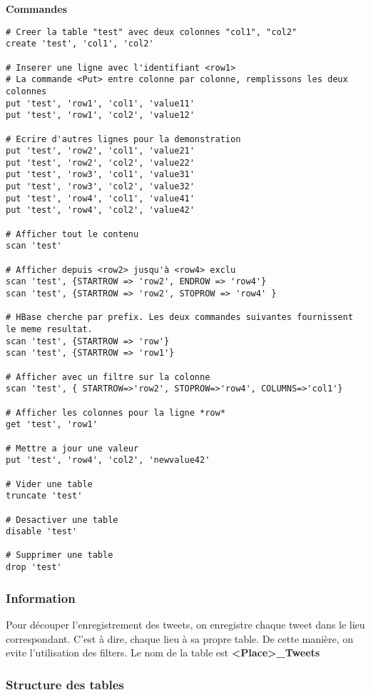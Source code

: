 \documentclass[a4paper,oneside,11pt]{article}
\begin{document}
\textbf{Commandes}

\begin{verbatim}
# Creer la table "test" avec deux colonnes "col1", "col2" 
create 'test', 'col1', 'col2'

# Inserer une ligne avec l'identifiant <row1>
# La commande <Put> entre colonne par colonne, remplissons les deux colonnes
put 'test', 'row1', 'col1', 'value11'
put 'test', 'row1', 'col2', 'value12'

# Ecrire d'autres lignes pour la demonstration
put 'test', 'row2', 'col1', 'value21'
put 'test', 'row2', 'col2', 'value22'
put 'test', 'row3', 'col1', 'value31'
put 'test', 'row3', 'col2', 'value32'
put 'test', 'row4', 'col1', 'value41'
put 'test', 'row4', 'col2', 'value42'

# Afficher tout le contenu
scan 'test'

# Afficher depuis <row2> jusqu'à <row4> exclu
scan 'test', {STARTROW => 'row2', ENDROW => 'row4'}
scan 'test', {STARTROW => 'row2', STOPROW => 'row4' }

# HBase cherche par prefix. Les deux commandes suivantes fournissent le meme resultat.
scan 'test', {STARTROW => 'row'}
scan 'test', {STARTROW => 'row1'}

# Afficher avec un filtre sur la colonne
scan 'test', { STARTROW=>'row2', STOPROW=>'row4', COLUMNS=>'col1'}

# Afficher les colonnes pour la ligne *row*
get 'test', 'row1'

# Mettre a jour une valeur
put 'test', 'row4', 'col2', 'newvalue42'

# Vider une table
truncate 'test'

# Desactiver une table
disable 'test'

# Supprimer une table
drop 'test'

\end{verbatim}


\subsubsection{Information}

Pour découper l'enregistrement des tweets, on enregistre chaque tweet dans le lieu correspondant. C'est à dire, chaque lieu à sa propre table. De cette manière, on evite l'utilisation des filters. Le nom de la table est \textbf{<Place>\_Tweets}

\subsubsection{Structure des tables}
\end{document}
